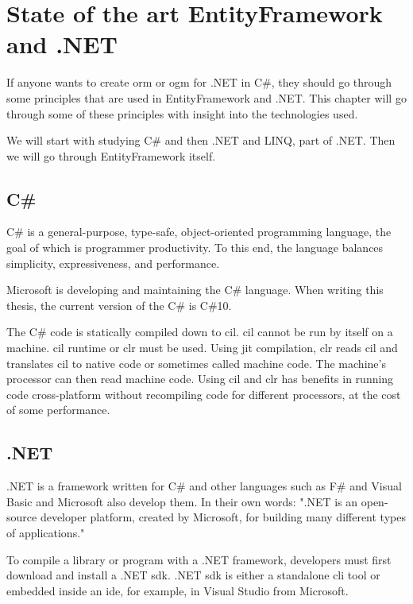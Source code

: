 \chapter {State of the art EntityFramework and .NET}

If anyone wants to create \acrshort{orm} or \acrshort{ogm} for .NET in C\#, they should go through some principles that are used in
EntityFramework and .NET. This chapter will go through some of these principles with insight into the technologies used.

We will start with studying C\# and then .NET and LINQ, part of .NET. Then we will go through EntityFramework itself.

\section {C\#}
C\# is a general-purpose, type-safe, object-oriented programming language, the goal of which is programmer productivity.
To this end, the language balances simplicity, expressiveness,
and performance. \cite{albahari_c_2019}

Microsoft is developing and maintaining the C\# language. When writing this thesis, the current version of the C\# is C\#10.

The C\# code is statically compiled down to \acrlong{cil}. \acrshort{cil} cannot be run by itself on a machine.
\acrshort{cil} runtime or \acrfull{clr} must be used. Using \acrfull{jit} compilation, \acrshort{clr} reads \acrshort{cil} and translates \acrshort{cil} to native
code or sometimes called machine code. The machine's processor can then read machine code. Using \acrshort{cil} and \acrshort{clr} has benefits in running code
cross-platform without recompiling code for different processors, at the cost of some performance. \cite{rodenburg_code_2021}

\section {.NET}

.NET is a framework written for C\# and other languages such as F\# and
Visual Basic and Microsoft also develop them.
In their own words: ".NET is an open-source developer
platform, created by Microsoft, for building many different types of applications." \cite{noauthor_what_nodate-2}

To compile a library or program with a .NET framework,
developers must first download and install a .NET \acrfull{sdk}.
.NET \acrfull{sdk} is either a standalone \acrfull{cli} tool or embedded inside an \acrshort{ide},
for example, in Visual Studio from Microsoft.

